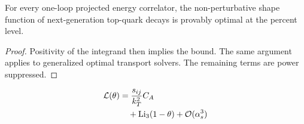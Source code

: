 \begin{theorem}\label{thm:2}
For every one-loop projected energy correlator, the non-perturbative
shape function of next-generation top-quark decays is provably optimal
at the percent level.
\end{theorem}

\begin{proof}
Positivity of the integrand then implies the bound. The same argument
applies to generalized optimal transport solvers. The remaining terms
are power suppressed.
\end{proof}

\begin{align}
  \mathcal{L}(\theta) &= \frac{s_{ij}}{k_T^2} C_A \nonumber \\
  &\quad + \mathrm{Li}_{3}(1 - \theta) + \mathcal{O}(\alpha_s^3) \label{eq:3}
\end{align}

